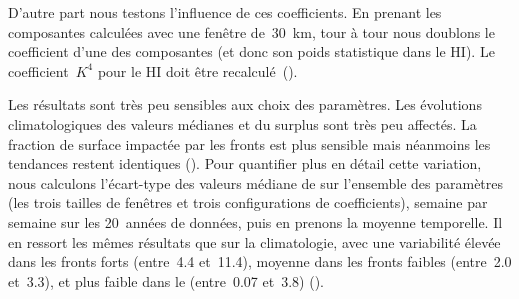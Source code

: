 D'autre part nous testons l'influence de ces coefficients. En prenant les composantes calculées avec une fenêtre de~\qty{30}{\km}, tour à tour nous doublons le coefficient d'une des composantes (et donc son poids statistique dans le HI). Le coefficient~\(K^4\) pour le HI doit être recalculé~().

\begin{table}
  \centering
  \caption[]{%
    Coefficients de normalisation pour les différents paramètres utilisés.
  }
  \label{tab:coefs}
\end{table}

Les résultats sont très peu sensibles aux choix des paramètres.
Les évolutions climatologiques des valeurs médianes et du surplus sont très peu affectés. La fraction de surface impactée par les fronts est plus sensible mais néanmoins les tendances restent identiques ().
Pour quantifier plus en détail cette variation, nous calculons l'écart-type des valeurs médiane de  sur l'ensemble des paramètres (les trois tailles de fenêtres et trois configurations de coefficients), semaine par semaine sur les 20~années de données, puis en prenons la moyenne temporelle.
Il en ressort les mêmes résultats que sur la climatologie, avec une variabilité élevée dans les fronts forts (entre~\qty{4.4}{\mugm} et~\qty{11.4}{\mugm}), moyenne dans les fronts faibles (entre~\qty{2.0}{\mugm} et~\qty{3.3}{\mugm}), et plus faible dans le  (entre~\qty{0.07}{\mugm} et~\qty{3.8}{\mugm}) ().

